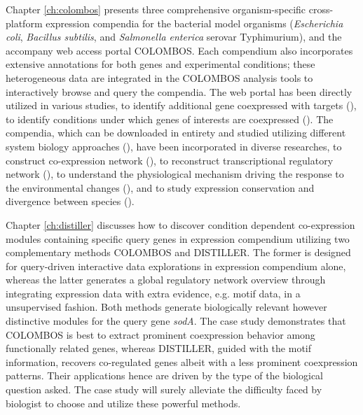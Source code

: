 Chapter \ref{ch:colombos} presents three comprehensive organism-specific cross-platform expression compendia for the bacterial model organisms  (\textit{Escherichia coli}, \textit{Bacillus subtilis}, and \textit{Salmonella  enterica} serovar Typhimurium), and the accompany web access portal COLOMBOS. Each compendium also incorporates extensive annotations for both genes and experimental conditions; these heterogeneous data are integrated  in the COLOMBOS analysis tools to interactively browse and query the compendia.  The web portal has been directly utilized in various studies, to identify  additional gene coexpressed with targets (\cite{Meysman2011, Fu2012,  Meysman2014a}), to identify conditions under which genes of  interests are coexpressed (\cite{Desai2013}).   The compendia, which can be downloaded in entirety and studied utilizing different system biology approaches (\cite{Lemmens2009, Michoel2009,  Zhao2011, DeSmet2011, Zarrineh2011}), have been incorporated in diverse  researches, to construct co-expression network (\cite{Cloots2011, Kolar2012}),  to reconstruct transcriptional regulatory network (\cite{Faria2013}), to understand the physiological mechanism driving the response to the  environmental changes (\cite{Balderas-Martinez2013}), and to study expression  conservation and divergence between species (\cite{Meysman2013}).



Chapter \ref{ch:distiller} discusses how to discover condition dependent co-expression modules containing specific query genes in expression compendium utilizing two complementary methods COLOMBOS and DISTILLER. The former is designed for query-driven interactive data explorations in expression compendium alone, whereas the latter generates a global regulatory network overview through integrating expression data with extra evidence, e.g. motif data, in a unsupervised fashion. Both methods generate biologically relevant however distinctive modules for the query gene \textit{sodA}. The case study demonstrates that COLOMBOS is best to extract prominent coexpression behavior among functionally related genes, whereas DISTILLER, guided with the motif information, recovers co-regulated genes albeit with a less prominent coexpression patterns. Their applications hence are driven by the type of the biological question asked. The case study will surely alleviate the difficulty faced by biologist to choose and utilize these powerful methods.



